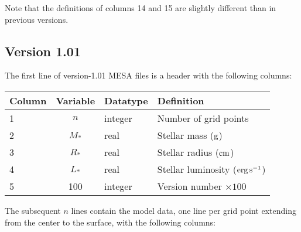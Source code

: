 \documentclass{article}
\newcommand{\Rstar}{\ensuremath{R_{\ast}}}
\newcommand{\Mstar}{\ensuremath{M_{\ast}}}
\newcommand{\Lstar}{\ensuremath{L_{\ast}}}
\newcommand{\cm}{\ensuremath{{\rm cm}}}
\newcommand{\gram}{\ensuremath{{\rm g}}}
\newcommand{\second}{\ensuremath{{\rm s}}}
\newcommand{\erg}{\ensuremath{{\rm erg}}}
\begin{document}
Note that the definitions of columns 14 and 15 are slightly different
than in previous versions.

\newpage

\subsection*{Version 1.01}

The first line of version-1.01 MESA files is a header with the following
columns:

\begin{table}[h!]
\begin{tabular}{|l|c|l|l|} \hline
Column & Variable & Datatype & Definition \\ \hline
1      & $n$ & integer & Number of grid points \\
2      & \Mstar & real & Stellar mass ($\gram$) \\
3      & \Rstar & real & Stellar radius ($\cm$) \\
4      & \Lstar & real & Stellar luminosity ($\erg\,\second^{-1}$) \\
5      & 100    & integer & Version number $\times 100$ \\ \hline
\end{tabular}
\end{table}

The subsequent $n$ lines contain the model data, one line per
grid point extending from the center to the surface, with the following columns:
\end{document}
